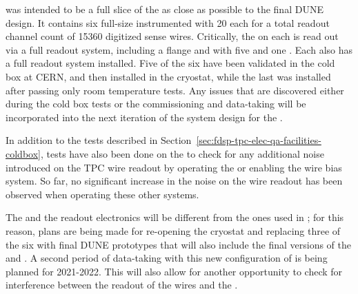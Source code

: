  was intended to be a full slice of the  as close as possible to the final DUNE \single design. It contains six full-size  instrumented with \num{20}  each for a total readout channel count of \num{15360} digitized sense wires. Critically, the  on each  is read out via a full  readout system, including a  flange and  with five  and one . Each  also has a full  readout system installed. Five of the six   have been validated in the cold box at CERN, and then installed in the  cryostat, while the last  was installed after passing only room temperature tests. Any issues that are discovered either during the cold box tests or the  commissioning and data-taking will be incorporated into the next iteration of the system design for the .

In addition to the tests described in Section~\ref{sec:fdsp-tpc-elec-qa-facilities-coldbox}, tests have also been done on the   to check for any additional noise introduced on the TPC wire readout by operating the  or enabling the wire bias  system. So far, no significant increase in the noise on the  wire readout has been observed when operating these other systems.

The  and the readout electronics will be different from the ones used in ; for this reason, plans are being made for re-opening the  cryostat and replacing three of the six  with final DUNE prototypes that will also include the final versions of the  and . A second period of data-taking with this new configuration of  is being planned for 2021-2022. This will also allow for another opportunity to check for interference between the readout of the  wires and the .
